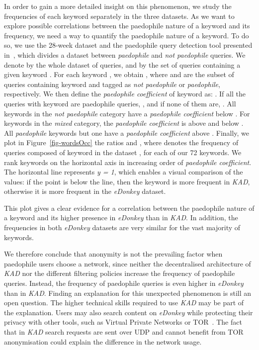 \documentclass[a4paper,oneside,12pt]{article}
\newcommand{\edonkey}{{\em eDonkey}\xspace}
\newcommand{\kad}{{\em KAD}\xspace}
\newcommand{\paedocoeff}{{\em paedophile coefficient}\xspace}
\newcommand{\paedo}{{\em paedophile}\xspace}
\newcommand{\notpaedo}{{\em not paedophile}\xspace}
\newcommand{\mixed}{{\em mixed}\xspace}
\newcommand{\ipm}{\cite{QuantifyingIPM}\xspace}
\begin{document}
In order to gain a more detailed insight on this phenomenon, we study the frequencies of each keyword separately in the three datasets. As we want to explore possible correlations between the paedophile nature of a keyword and its frequency, we need a way to quantify the paedophile nature of a keyword. To do so, we use the 28-week dataset and the paedophile query detection tool presented in~\ipm, which divides a dataset between \paedo and \notpaedo queries. We denote by  the whole dataset of queries, and by  the set of queries containing a given keyword . For each keyword , we obtain , where  and  are the subset of queries containing keyword  and tagged as \notpaedo or \paedo, respectively. We then define the \paedocoeff  of keyword  as: . If all the queries with keyword  are paedophile queries, , and if none of them are, . All keywords in the \notpaedo category have a \paedocoeff below . For keywords in the \mixed category, the \paedocoeff is above  and below . All \paedo keywords but one have a \paedocoeff above . Finally, we plot in Figure~\ref{fig-wordsOcc} the ratios  and , where  denotes the frequency of queries composed of keyword  in the dataset , for each of our 72 keywords. We rank keywords on the horizontal axis in increasing order of \paedocoeff. The horizontal line represents {\em y = 1}, which enables a visual comparison of the values: if the point is below the line, then the keyword is more frequent in \kad, otherwise it is more frequent in the \edonkey dataset. 

This plot gives a clear evidence for a correlation between the paedophile nature of a keyword and its higher presence in \edonkey than in \kad. In addition, the frequencies in both \edonkey datasets are very similar for the vast majority of keywords.



We therefore conclude that anonymity is not the prevailing factor when paedophile users choose a network, since neither the decentralised architecture of \kad nor the different filtering policies increase the frequency of paedophile queries. Instead, the frequency of paedophile queries is even higher in \edonkey than in \kad. Finding an explanation for this unexpected phenomenon is still an open question. The higher technical skills required to use \kad may be part of the explanation. Users may also search content on \edonkey while protecting their privacy with other tools, such as Virtual Private Networks or TOR~\cite{torproject}. The fact that in \kad search requests are sent over UDP and cannot benefit from TOR anonymisation could explain the difference in the network usage. 
\end{document}
